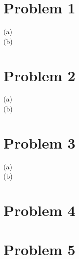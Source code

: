 \documentclass{article}
\begin{document}
\section*{Problem 1}
\begin{description}
    \item[(a)]
    \item[(b)]
\end{description}

\section*{Problem 2}
\begin{description}
    \item[(a)]
    \item[(b)]
\end{description}

\section*{Problem 3}
\begin{description}
    \item[(a)]
    \item[(b)]
\end{description}

\section*{Problem 4}

\section*{Problem 5}
\end{document}
